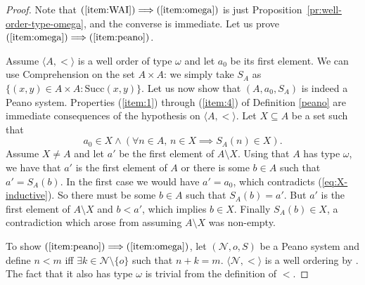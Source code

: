 \begin{proof}
	Note that $(\ref{item:WAI}){\implies}(\ref{item:omega})$ is just
        Proposition~\ref{pr:well-order-type-omega}, and the converse is immediate.
	Let us prove $(\ref{item:omega}) {\implies} (\ref{item:peano})$.

        Assume $\langle A,< \rangle$ is a
        well order of type $\omega$ and let $a_0$ be its first element.
        We can use Comprehension on the set $A\times A$: we simply take $S_A$ as $\{(x,y)\in A\times A: \text{Succ}(x,y)\}$. Let us now show that $(A,a_0,S_A)$ is indeed a Peano system. Properties (\ref{item:1}) through (\ref{item:4}) of Definition \ref{peano} are immediate consequences of the hypothesis on $\langle A,< \rangle$. Let $X\subseteq A$ be a set such that 
        \begin{equation}\label{eq:X-inductive}
          a_0\in X \land (\forall n\in A, \, n\in X \implies S_A(n)\in X).
	\end{equation}
	Assume $X\neq A$ and let $a'$ be the first element of $A\setminus X$. Using that $A$ has type $\omega$, we have that $a'$ is the first element of $A$ or there is some $b\in A$ such that $a' = S_A (b)$. In the first case we would have $a' = a_0$, which contradicts (\ref{eq:X-inductive}). So there must be some $b\in A$ such that $S_A (b) = a'$. But $a'$ is the first element of $A\setminus X$ and $b<a'$, which implies $b\in X$. Finally $S_A(b) \in X$, a contradiction which arose from assuming $A\setminus X$ was non-empty.
	
	To show $(\ref{item:peano}){\implies}(\ref{item:omega})$, let $(\mathcal{N}, o, S)$ be a Peano system and define $n<m$ iff $\exists k\in\mathcal{N}{\setminus} \{o\}$ such that $n+k = m$.
	 $\langle \mathcal{N},< \rangle$ is a well ordering by \cite[Theorem 5.23]{Moscho}. The fact that it also has type $\omega$ is trivial from the definition of $<$.
\end{proof}

